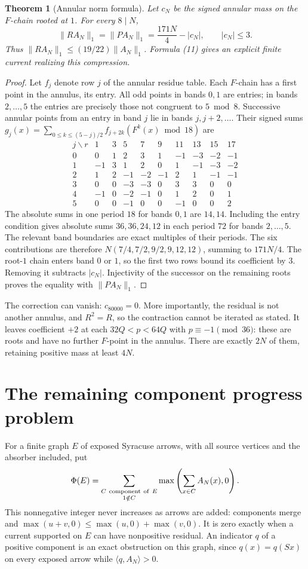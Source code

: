 \documentclass[11pt]{article}
\newtheorem{theorem}{Theorem}
\begin{document}
\begin{theorem}[Annular norm formula]\label{thm:norm}
Let $c_N$ be the signed annular mass on the $F$-chain rooted at $1$.
For every $8\mid N$,
\[
\|RA_N\|_1=\|PA_N\|_1=\frac{171N}{4}-|c_N|,
\qquad |c_N|\le3.
\]
Thus $\|RA_N\|_1\le(19/22)\|A_N\|_1$. Formula (11) gives an explicit
finite current realizing this compression.
\end{theorem}
\begin{proof}
Let $f_j$ denote row $j$ of the annular residue table. Each $F$-chain
has a first point in the annulus, its entry. All odd points in bands
$0,1$ are entries; in bands $2,\ldots,5$ the entries are precisely those
not congruent to $5\bmod8$. Successive annular points from an entry in
band $j$ lie in bands $j,j+2,\ldots$. Their signed sums
$g_j(x)=\sum_{0\le k\le(5-j)/2}f_{j+2k}(F^k(x)\bmod18)$ are
\[
\begin{array}{c|rrrrrrrrr}
j\backslash r&1&3&5&7&9&11&13&15&17\\ \hline
0&0&1&2&3&1&-1&-3&-2&-1\\
1&-1&3&1&2&0&1&-1&-3&-2\\
2&1&2&-1&-2&-1&2&1&-1&-1\\
3&0&0&-3&-3&0&3&3&0&0\\
4&-1&0&-2&-1&0&1&2&0&1\\
5&0&0&-1&0&0&-1&0&0&2
\end{array}
\]
The absolute sums in one period $18$ for bands $0,1$ are $14,14$.
Including the entry condition gives absolute sums $36,36,24,12$
in each period $72$ for bands $2,\ldots,5$. The relevant band boundaries
are exact multiples of their periods. The six contributions are therefore
$N(7/4,7/2,9/2,9,12,12)$, summing to $171N/4$.
The root-$1$ chain enters band $0$ or $1$, so the first two rows bound
its coefficient by $3$. Removing it subtracts $|c_N|$.
Injectivity of the successor on the remaining roots proves the equality
with $\|PA_N\|_1$.
\end{proof}
The correction can vanish: $c_{80000}=0$. More importantly, the residual
is not another annulus, and $R^2=R$, so the contraction cannot be iterated
as stated. It leaves coefficient $+2$ at each
$32Q<p<64Q$ with $p\equiv-1\pmod{36}$: these are roots and have no
further $F$-point in the annulus. There are exactly $2N$ of them, retaining
positive mass at least $4N$.

\section{The remaining component progress problem}
For a finite graph $E$ of exposed Syracuse arrows, with all source
vertices and the absorber included, put
\[
\Phi(E)=\sum_{\substack{C\ {\rm component\ of}\ E\\1\notin C}}
 \max\left(\sum_{x\in C}A_N(x),0\right).
\]
This nonnegative integer never increases as arrows are added:
components merge and $\max(u+v,0)\le\max(u,0)+\max(v,0)$.
It is zero exactly when a current supported on $E$ can have
nonpositive residual. An indicator $q$ of a positive component is an
exact obstruction on this graph, since $q(x)=q(Sx)$ on every exposed
arrow while $\langle q,A_N\rangle>0$.
\end{document}

